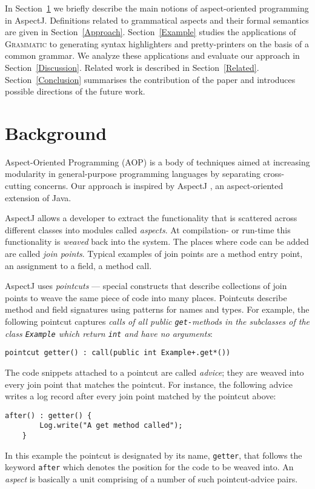 \documentclass{IOS-Book-Article}     %
\newcommand{\secref}[1]{Section~\ref{#1}}
\newcommand{\tool}[1]{\textsc{#1}}
\newcommand{\Grammatic}[0]{\tool{Grammatic}}
\begin{document}
In \secref{Background} we briefly describe the main notions of aspect-oriented programming in AspectJ. 
Definitions related to grammatical aspects and their formal semantics are given in \secref{Approach}. 
\secref{Example} studies the applications of \Grammatic{} to generating syntax highlighters and pretty-printers on the basis of a common grammar. We analyze these applications and evaluate our approach in \secref{Discussion}. Related work is described in \secref{Related}. \secref{Conclusion} summarises the contribution of the paper and introduces possible directions of the future work.

\section{Background}\label{Background}
Aspect-Oriented Programming (AOP) is a body of techniques aimed at increasing modularity in general-purpose programming languages by separating cross-cutting concerns. Our approach is inspired by AspectJ \cite{AspectJ}, an aspect-oriented extension of Java. 

AspectJ allows a developer to extract the functionality that is scattered across different classes into modules called \emph{aspects}. At compilation- or run-time this functionality is \emph{weaved} back into the system. The places where code can be added are called \emph{join points}. Typical examples of join points are a method entry point, an assignment to a field, a method call. 

AspectJ uses \emph{pointcuts} --- special constructs that describe collections of join points to weave the same piece of code into many places. Pointcuts describe method and field signatures using patterns for names and types. For example, the following pointcut captures \textit{calls of all public \texttt{get-}methods in the subclasses of the class \texttt{Example} which return \texttt{int} and have no arguments}:
\begin{lstlisting}[language={[AspectJ]Java}]
    pointcut getter() : call(public int Example+.get*())
\end{lstlisting}

The code snippets attached to a pointcut are called \emph{advice}; they are weaved into every join point that matches the pointcut. For instance, the following advice writes a log record after every join point matched by the pointcut above:
\begin{lstlisting}[language={[AspectJ]Java}]
    after() : getter() {
        Log.write("A get method called");
    }
\end{lstlisting}
In this example the pointcut is designated by its name, \texttt{getter}, that follows the keyword \texttt{after} which denotes the position for the code to be weaved into.
An \emph{aspect} is basically a unit comprising of a number of such pointcut-advice pairs.
\end{document}
